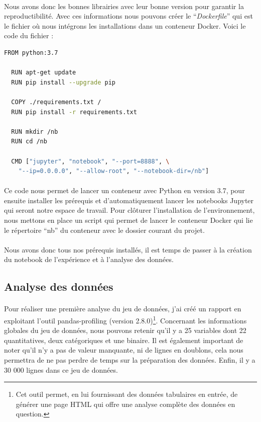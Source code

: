 \documentclass[10pt, french, a4paper]{report}
\begin{document}
\paragraph{}
Nous avons donc les bonnes librairies avec leur bonne version pour garantir la reproductibilité. Avec ces informations nous pouvons créer le ``\textit{Dockerfile}'' qui est le fichier où nous intégrons les installations dans un conteneur Docker. Voici le code du fichier : 

\begin{lstlisting}[language=bash]
  FROM python:3.7

  RUN apt-get update 
  RUN pip install --upgrade pip
  
  COPY ./requirements.txt /
  RUN pip install -r requirements.txt
  
  RUN mkdir /nb
  RUN cd /nb
  
  CMD ["jupyter", "notebook", "--port=8888", \ 
    "--ip=0.0.0.0", "--allow-root", "--notebook-dir=/nb"]
\end{lstlisting}

\paragraph{}
Ce code nous permet de lancer un conteneur avec Python en version 3.7, pour ensuite installer les prérequis et d'automatiquement lancer les notebooks Jupyter qui seront notre espace de travail. Pour clôturer l'installation de l'environnement, nous mettons en place un script qui permet de lancer le conteneur Docker qui lie le répertoire ``nb'' du conteneur avec le dossier courant du projet.

\paragraph{}
Nous avons donc tous nos prérequis installés, il est temps de passer à la création du notebook de l'expérience et à l'analyse des données.

\subsection{Analyse des données}

\paragraph{}
Pour réaliser une première analyse du jeu de données, j'ai créé un rapport en exploitant l'outil pandas-profiling (version 2.8.0)\footnote{Cet outil permet, en lui fournissant des données tabulaires en entrée, de générer une page HTML qui offre une analyse complète des données en question.}. Concernant les informations globales du jeu de données, nous pouvons retenir qu'il y a 25 variables dont 22 quantitatives, deux catégoriques et une binaire. Il est également important de noter qu'il n'y a pas de valeur manquante, ni de lignes en doublons, cela nous permettra de ne pas perdre de temps sur la préparation des données. Enfin, il y a 30 000 lignes dans ce jeu de données.
\end{document}
